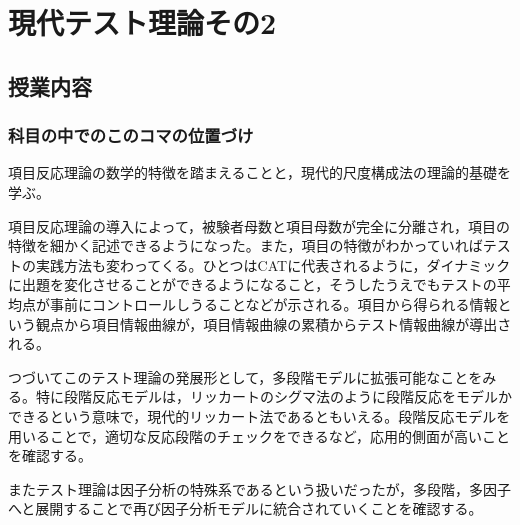 \section{現代テスト理論その2}
\subsection{授業内容}
\subsubsection{科目の中でのこのコマの位置づけ}
項目反応理論の数学的特徴を踏まえることと，現代的尺度構成法の理論的基礎を学ぶ。

項目反応理論の導入によって，被験者母数と項目母数が完全に分離され，項目の特徴を細かく記述できるようになった。また，項目の特徴がわかっていればテストの実践方法も変わってくる。ひとつはCATに代表されるように，ダイナミックに出題を変化させることができるようになること，そうしたうえでもテストの平均点が事前にコントロールしうることなどが示される。項目から得られる情報という観点から項目情報曲線が，項目情報曲線の累積からテスト情報曲線が導出される。

つづいてこのテスト理論の発展形として，多段階モデルに拡張可能なことをみる。特に段階反応モデルは，リッカートのシグマ法のように段階反応をモデルかできるという意味で，現代的リッカート法であるともいえる。段階反応モデルを用いることで，適切な反応段階のチェックをできるなど，応用的側面が高いことを確認する。

またテスト理論は因子分析の特殊系であるという扱いだったが，多段階，多因子へと展開することで再び因子分析モデルに統合されていくことを確認する。

